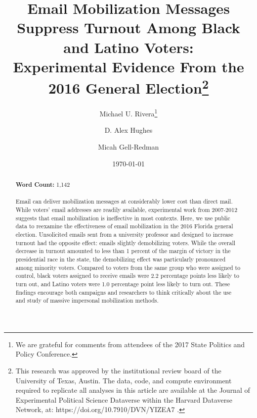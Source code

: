 \documentclass[12pt]{article}
\begin{document}
\author[1]{Michael U. Rivera\thanks{We are grateful for comments from
    attendees of the 2017 State Politics and Policy Conference.}}
\author[1]{D. Alex Hughes} \author[2,3]{Micah Gell-Redman}

\renewcommand\Authands{ and }

\title{Email Mobilization Messages Suppress Turnout Among Black and Latino Voters:\\
  Experimental Evidence From the 2016 General Election\thanks{This
    research was approved by the institutional review board of the
    University of Texas, Austin.  The data, code, and compute
    environment required to replicate all analyses in this article are
    available at the Journal of Experimental Political Science
    Dataverse within the Harvard Dataverse Network, at:
    https://doi.org/10.7910/DVN/YIZEA7 \citep{rivera2020}.}}  \date{\today}


\maketitle
\thispagestyle{empty}

\begin{abstract}
  \noindent \textbf{Word Count:}  1,142 \\ \\
  Email can deliver mobilization messages at considerably lower cost
  than direct mail. While voters’ email addresses are readily
  available, experimental work from 2007-2012 suggests that email
  mobilization is ineffective in most contexts. Here, we use public
  data to reexamine the effectiveness of email mobilization in the
  2016 Florida general election. Unsolicited emails sent from a
  university professor and designed to increase turnout had the
  opposite effect: emails slightly demobilizing voters. While the
  overall decrease in turnout amounted to less than 1 percent of the
  margin of victory in the presidential race in the state, the
  demobilizing effect was particularly pronounced among minority
  voters. Compared to voters from the same group who were assigned to
  control, black voters assigned to receive emails were 2.2 percentage
  points less likely to turn out, and Latino voters were 1.0
  percentage point less likely to turn out. These findings encourage
  both campaigns and researchers to think critically about the use and
  study of massive impersonal mobilization methods.

\end{abstract}
\end{document}

